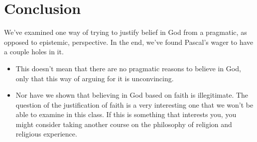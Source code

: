 \documentclass[letterpaper,10pt]{article}
\begin{document}
\section{Conclusion}
We've examined one way of trying to justify belief in God from a pragmatic, as opposed to epistemic, perspective. In the end, we've found Pascal's wager to have a couple holes in it.
\begin{itemize}
 \item This doesn't mean that there are no pragmatic reasons to believe in God, only that this way of arguing for it is unconvincing.
 \item Nor have we shown that believing in God based on faith is illegitimate. The question of the justification of faith is a very interesting one that we won't be able to examine in this class. If this is something that interests you, you might consider taking another course on the philosophy of religion and religious experience.
\end{itemize}
\end{document}

